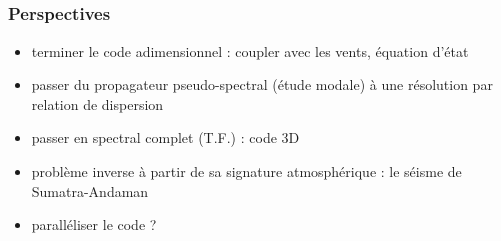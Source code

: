 \documentclass[c]{beamer}
\begin{document}
\subsection{}

\begin{frame}
\frametitle{Perspectives}
\begin{itemize}
    \item terminer le code adimensionnel : coupler avec les vents, équation d'état
    \item passer du propagateur pseudo-spectral (étude modale) à une résolution par relation de dispersion
    \item passer en spectral complet (T.F.) : code 3D
    \item problème inverse à partir de sa signature atmosphérique : le séisme de Sumatra-Andaman
    \item paralléliser le code ?
\end{itemize}
\end{frame}
\end{document}
